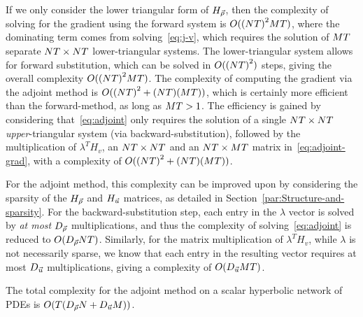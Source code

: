 				If we only consider the lower triangular form of $H_{\vec{\rho}}$, then the
				complexity of solving for the gradient using the forward system is
				$O(\left(\nlinks\ntime\right)^{2}\ncontrols\ntime)$, where the dominating
				term comes from solving~\eqref{eq:j-v}, which requires the solution
				of $MT$ separate $NT\times NT$
				lower-triangular systems. The lower-triangular system allows for forward
				substitution, which can be solved in $O(\left(\nlinks\ntime\right)^{2})$
				steps, giving the overall complexity $O(\left(\nlinks\ntime\right)^{2}\ncontrols\ntime)$.
				The complexity of computing the gradient via the adjoint method is
				$O(\left(\nlinks\ntime\right)^{2}+\left(\nlinks\ntime\right)\left(\ncontrols\ntime\right))$,
				which is certainly more efficient than the forward-method, as long
				as $MT>1$. The efficiency is gained by considering
				that~\eqref{eq:adjoint} only requires the solution of a single $NT\times NT$
				\emph{upper}-triangular system (via backward-substitution), followed
				by the multiplication of $\lambda^{T}H_{v}$, an $NT\times NT$
				and an $NT\times MT$ matrix in~\eqref{eq:adjoint-grad},
				with a complexity of $O(\left(\nlinks\ntime\right)^{2}+\left(\nlinks\ntime\right)\left(\ncontrols\ntime\right))$.
								
				For the adjoint method, this complexity can be improved upon by considering
				the sparsity of the $H_{\vec{\rho}}$ and $H_{\vec{u}}$ matrices, as detailed in Section~\ref{par:Structure-and-sparsity}.
				For the backward-substitution step, each entry in the $\lambda$ vector
				is solved by \emph{at most} $D_{\vec{\rho}}$ multiplications, and
				thus the complexity of solving~\eqref{eq:adjoint} is reduced to
				$O(D_{\vec{\rho}}NT)$. Similarly, for the matrix multiplication
				of $\lambda^{T}H_{v}$, while $\lambda$ is not necessarily sparse,
				we know that each entry in the resulting vector requires at most $D_{\vec{u}}$
				multiplications, giving a complexity of $O(D_{\vec{u}}MT)$. 
				\begin{prop}
					\textup{The total complexity for the adjoint method on a scalar hyperbolic
						network of PDEs is }$O(\ntime\left(\degree{\state}\nlinks+\degree{\control}\ncontrols\right))$.\end{prop}
				
